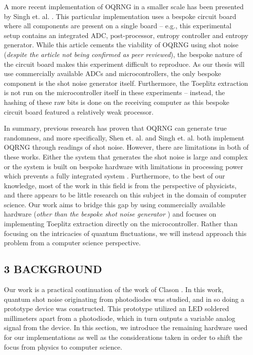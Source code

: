 \documentclass{sigchi}
\begin{document}
A more recent implementation of OQRNG in a smaller scale has been presented by Singh et. al. \cite{singh}. This particular implementation uses a bespoke circuit board where all components are present on a single board -- e.g., this experimental setup contains an integrated ADC, post-processor, entropy controller and entropy generator. While this article cements the viability of OQRNG using shot noise (\emph{despite the article not being confirmed as peer reviewed}), the bespoke nature of the circuit board makes this experiment difficult to reproduce. As our thesis will use commercially available ADCs and microcontrollers, the only bespoke component is the shot noise generator itself. Furthermore, the Toeplitz extraction is not run on the microcontroller itself in these experiments -- instead, the hashing of these raw bits is done on the receiving computer as this bespoke circuit board featured a relatively weak processor.

In summary, previous research has proven that OQRNG can generate true randomness, and more specifically, Shen et. al. \cite{contender1} and Singh et. al. \cite{singh} both implement OQRNG through readings of shot noise. However, there are limitations in both of these works. Either the system that generates the shot noise is large and complex \cite{contender1} or the system is built on bespoke hardware with limitations in processing power which prevents a fully integrated system \cite{singh}. Furthermore, to the best of our knowledge, most of the work in this field is from the perspective of physicists, and there appears to be little research on this subject in the domain of computer science. Our work aims to bridge this gap by using commercially available hardware (\emph{other than the bespoke shot noise generator \cite{Clason2023}}) and focuses on implementing Toeplitz extraction directly on the microcontroller. Rather than focusing on the intricacies of quantum fluctuations, we will instead approach this problem from a computer science perspective.

\subsection{3 BACKGROUND}\label{background}

Our work is a practical continuation of the work of Clason \cite{Clason2023}. In this work, quantum shot noise originating from photodiodes was studied, and in so doing a prototype device was constructed. This prototype utilized an LED soldered millimeters apart from a photodiode, which in turn outputs a variable analog signal from the device. In this section, we introduce the remaining hardware used for our implementations as well as the considerations taken in order to shift the focus from physics to computer science.
\end{document}
